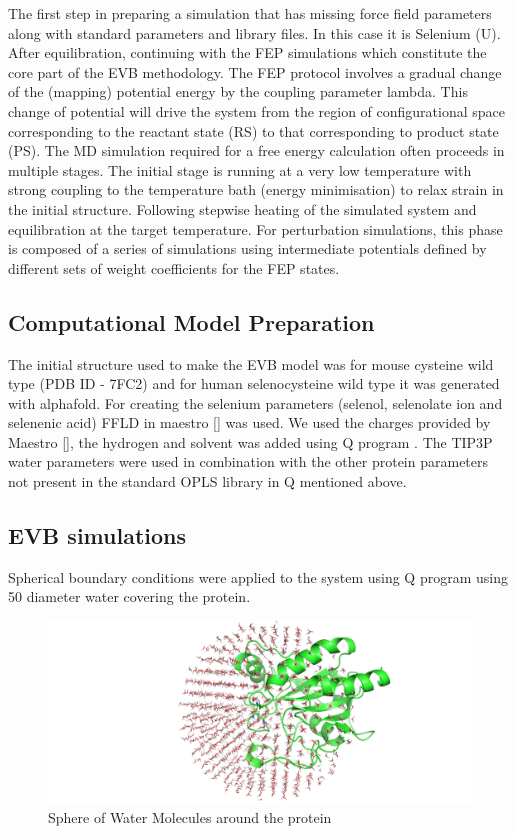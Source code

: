 \documentclass{article}
\begin{document}
The first step in preparing a simulation that has missing force field parameters along with standard parameters and library files. In this case it is Selenium (U). After equilibration, continuing with the FEP simulations which constitute the core part of the EVB methodology. The FEP protocol involves a gradual change of the (mapping) potential energy by the coupling parameter lambda. This change of potential will drive the system from the region of configurational space corresponding to the reactant state (RS) to that corresponding to product state (PS). The MD simulation required for a free energy calculation often proceeds in multiple stages. The initial stage is running at a very low temperature with strong coupling to the temperature bath (energy minimisation) to relax strain in the initial structure. Following stepwise heating of the simulated system and equilibration at the target temperature. For perturbation simulations, this phase is composed of a series of simulations using intermediate potentials defined by different sets of weight coefficients for the FEP states.

\subsection{Computational Model Preparation}

The initial structure used to make the EVB model was for mouse cysteine wild type (PDB ID - 7FC2) and for human selenocysteine wild type it was generated with alphafold. For creating the selenium parameters (selenol, selenolate ion and selenenic acid) FFLD in maestro [] was used. We used the charges provided by Maestro [], the hydrogen and solvent was added using Q program \cite{Marelius1999}. The TIP3P water parameters were used in combination with the other protein parameters not present in the standard OPLS library in Q mentioned above.

\subsection{EVB simulations}

Spherical boundary conditions \cite{King1989} were applied to the system using Q program \cite{Marelius1999} using 50 \text{\AA} diameter water covering the protein.

\begin{figure}
\includegraphics{../figures/solvent_sphere.png} 
\caption{Sphere of Water Molecules around the protein}
\label{fig:figure1}
\end{figure}
\end{document}
